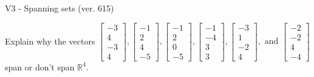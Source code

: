 \begin{exercise}
  \begin{exerciseTitle}V3 - Spanning sets (ver. 615)\end{exerciseTitle}
  \begin{exerciseStatement}
    Explain why the vectors \(\left[\begin{array}{r}
-3 \\
4 \\
-3 \\
4
\end{array}\right] , \left[\begin{array}{r}
-1 \\
2 \\
4 \\
-5
\end{array}\right] , \left[\begin{array}{r}
-1 \\
2 \\
0 \\
-5
\end{array}\right] , \left[\begin{array}{r}
-1 \\
-4 \\
3 \\
3
\end{array}\right] , \left[\begin{array}{r}
-3 \\
1 \\
-2 \\
4
\end{array}\right] , \text{ and } \left[\begin{array}{r}
-2 \\
-2 \\
4 \\
-4
\end{array}\right]\) span or don't span \(\mathbb{R}^4\). 
	



\end{exerciseStatement}
\end{exercise}
